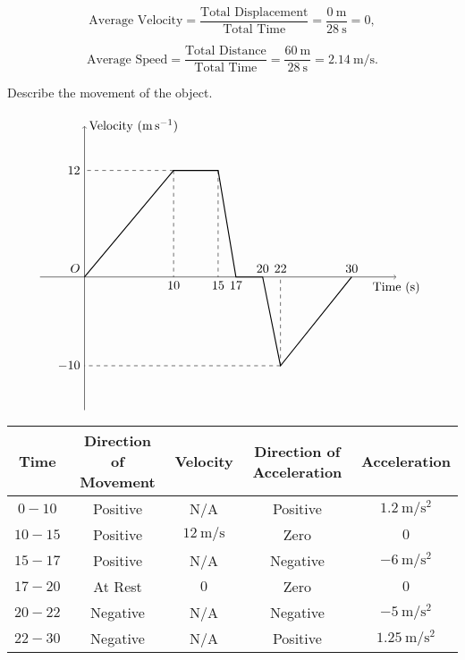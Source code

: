 \documentclass[8pt]{article}
\begin{document}
		\[\text{Average Velocity} = \frac{\text{Total Displacement}}{\text{Total Time}} = \frac{\qty{0}{\metre}}{\qty{28}{\second}} = 0,\]
		
		\[\text{Average Speed} = \frac{\text{Total Distance}}{\text{Total Time}} = \frac{\qty{60}{\metre}}{\qty{28}{\second}} = \qty{2.14}{\metre\per\second}.\]

		\exmp {} Describe the movement of the object.

		\[
			\begin{tikzpicture}[scale = 0.25]
				\draw [black, thick] (0, 0)--(10, 12)--(15, 12)--(17, 0)--(20, 0)--(22, -10)--(30, 0);
				\draw [black, ->] (-5, 0)--(35, 0) node[below] {Time \((\unit{\second})\)};
				\draw [black, ->] (0, -15)--(0, 17) node[right] {Velocity \((\unit{\metre\per\second})\)};
				\draw [black, dashed] (10, 12)--(0, 12) node [left] {\(12\)};
				\draw [black, dashed] (22, -10)--(0, -10) node [left] {\(-10\)};
				\draw [black, dashed] (10, 12)--(10, 0) node [below] {\(10\)};
				\draw [black, dashed] (15, 12)--(15, 0) node [below] {\(15\)};
				\draw [black, dashed] (22, -10)--(22, 0) node [above] {\(22\)};
				\node at (17, 0) [below] {\(17\)};
				\node at (20, 0) [above] {\(20\)};
				\node at (30, 0) [above] {\(30\)};
				\node at (0, 0) [anchor = south east] {\(O\)};
			\end{tikzpicture}
		\]

		\begin{center}
			\begin{tabular}{c|c|c|c|c}
				Time & Direction of Movement & Velocity & Direction of Acceleration & Acceleration\\
				\hline\hline
				\(0-10\) & Positive & N/A & Positive & \(\qty{1.2}{\metre\per\second\squared}\)\\
				\hline
				\(10-15\) & Positive & \(\qty{12}{\metre\per\second}\) & Zero & \(0\)\\
				\hline
				\(15-17\) & Positive & N/A & Negative & \(\qty{-6}{\metre\per\second\squared}\)\\
				\hline
				\(17-20\) & At Rest & \(0\) & Zero & \(0\)\\
				\hline
				\(20-22\) & Negative & N/A & Negative & \(\qty{-5}{\metre\per\second\squared}\)\\
				\hline
				\(22-30\) & Negative & N/A & Positive & \(\qty{1.25}{\metre\per\second\squared}\)
			\end{tabular}
		\end{center}
\end{document}
